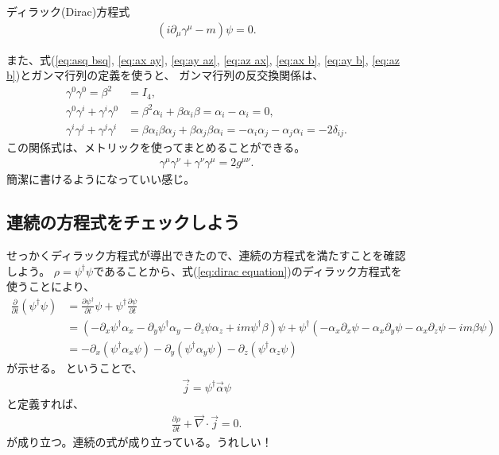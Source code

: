 \documentclass[10pt,a4paper]{jarticle}
\begin{document}
\begin{itembox}[l]{ディラック(Dirac)方程式}
\begin{align}
(i\partial_\mu \gamma^\mu - m )\psi = 0. \label{eq:dirac equation 2}
\end{align}
\end{itembox}
%
また、式(\ref{eq:asq bsq}, \ref{eq:ax ay}, \ref{eq:ay az}, \ref{eq:az ax}, \ref{eq:ax b}, \ref{eq:ay b}, \ref{eq:az b})とガンマ行列の定義を使うと、
ガンマ行列の反交換関係は、
\begin{align}
\gamma^0 \gamma^0 = \beta^2 &= I_4, \\
\gamma^0 \gamma^i + \gamma^i \gamma^0 &= \beta^2 \alpha_i + \beta \alpha_i \beta = \alpha_i - \alpha_i = 0,\\
\gamma^i \gamma^j + \gamma^j \gamma^i &= \beta \alpha_i \beta \alpha_j + \beta \alpha_j \beta \alpha_i = -\alpha_i \alpha_j - \alpha_j \alpha_i = - 2\delta_{ij}.
\end{align}
この関係式は、メトリックを使ってまとめることができる。
\begin{align}
\gamma^\mu \gamma^\nu + \gamma^\nu \gamma^\mu = 2g^{\mu\nu}. \label{eq:dirac matrix anticommut}
\end{align}
簡潔に書けるようになっていい感じ。



\subsection{連続の方程式をチェックしよう}
せっかくディラック方程式が導出できたので、連続の方程式を満たすことを確認しよう。
$\rho = \psi^\dagger \psi$であることから、式(\ref{eq:dirac equation})のディラック方程式を使うことにより、
\begin{align}
\frac{\partial}{\partial t} (\psi^\dagger \psi)
&= \frac{\partial\psi^\dagger}{\partial t}\psi + \psi^\dagger \frac{\partial\psi}{\partial t} \nonumber\\
&=
( -\partial_x \psi^\dagger \alpha_x - \partial_y \psi^\dagger \alpha_y - \partial_z \psi \alpha_z + i m\psi^\dagger \beta) \psi
+ \psi^\dagger ( -\alpha_x \partial_x \psi -\alpha_x \partial_y \psi -\alpha_x \partial_z \psi -i m\beta \psi)
\nonumber\\
&=
- \partial_x ( \psi^\dagger \alpha_x \psi )
- \partial_y ( \psi^\dagger \alpha_y \psi )
- \partial_z ( \psi^\dagger \alpha_z \psi )
\end{align}
が示せる。
%
ということで、
\begin{align}
\vec j = \psi^\dagger \vec\alpha \psi
\end{align}
と定義すれば、
\begin{align}
\frac{\partial\rho}{\partial t} + \vec\nabla \cdot \vec j = 0.
\end{align}
が成り立つ。連続の式が成り立っている。うれしい！
\end{document}
